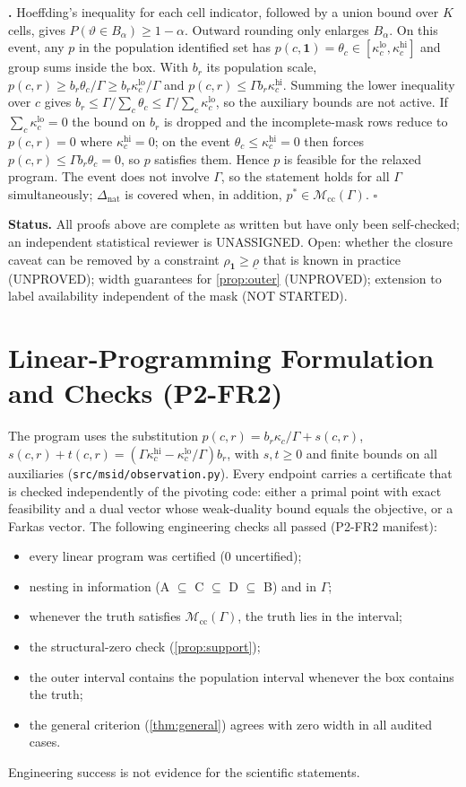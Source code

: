 \documentclass{article}
\theoremstyle{plain}
\theoremstyle{definition}
\theoremstyle{remark}
\newcommand{\one}{\mathbf{1}}
\newcommand{\Dnat}{\Delta_{\mathrm{nat}}}
\newcommand{\Mcc}{\mathcal{M}_{\mathrm{cc}}}
\begin{document}
\textbf{.} Hoeffding's inequality for each cell indicator,
followed by a union bound over $K$ cells, gives
$P(\vartheta\in B_\alpha)\ge1-\alpha$. Outward rounding only enlarges
$B_\alpha$. On this event, any $p$ in the population identified set has
$p(c,\one)=\theta_c\in[\kappa^{\mathrm{lo}}_c,\kappa^{\mathrm{hi}}_c]$ and group
sums inside the box. With $b_r$ its population scale,
$p(c,r)\ge b_r\theta_c/\Gamma\ge b_r\kappa^{\mathrm{lo}}_c/\Gamma$ and
$p(c,r)\le\Gamma b_r\kappa^{\mathrm{hi}}_c$. Summing the lower inequality over
$c$ gives $b_r\le\Gamma/\sum_c\theta_c\le\Gamma/\sum_c\kappa^{\mathrm{lo}}_c$,
so the auxiliary bounds are not active. If $\sum_c\kappa^{\mathrm{lo}}_c=0$ the
bound on $b_r$ is dropped and the incomplete-mask rows reduce to $p(c,r)=0$
where $\kappa^{\mathrm{hi}}_c=0$; on the event $\theta_c\le\kappa^{\mathrm{hi}}_c=0$
then forces $p(c,r)\le\Gamma b_r\theta_c=0$, so $p$ satisfies them. Hence $p$ is
feasible for the relaxed program. The event does not involve $\Gamma$, so the
statement holds for all $\Gamma$ simultaneously; $\Dnat$ is covered when, in
addition, $p^*\in\Mcc(\Gamma)$. $\square$

\textbf{Status.} All proofs above are complete as written but have only been
self-checked; an independent statistical reviewer is UNASSIGNED. Open: whether the closure caveat can be removed by a
constraint $\rho_{\one}\ge\underline\rho$ that is known in practice (UNPROVED);
width guarantees for \cref{prop:outer} (UNPROVED); extension to label
availability independent of the mask (NOT STARTED).

\section{Linear-Programming Formulation and Checks (P2-FR2)}
\label{app:fr2}

The program uses the substitution $p(c,r)=b_r\kappa_c/\Gamma+s(c,r)$,
$s(c,r)+t(c,r)=(\Gamma\kappa^{\mathrm{hi}}_c-\kappa^{\mathrm{lo}}_c/\Gamma)b_r$,
with $s,t\ge0$ and finite bounds on all auxiliaries (\texttt{src/msid/observation.py}).
Every endpoint carries a certificate that is checked independently of the
pivoting code: either a primal point with exact feasibility and a dual vector
whose weak-duality bound equals the objective, or a Farkas vector. The
following engineering checks all passed (P2-FR2 manifest):
\begin{itemize}
\item every linear program was certified (0 uncertified);
\item nesting in information (A $\subseteq$ C $\subseteq$ D $\subseteq$ B) and in $\Gamma$;
\item whenever the truth satisfies $\Mcc(\Gamma)$, the truth lies in the interval;
\item the structural-zero check (\cref{prop:support});
\item the outer interval contains the population interval whenever the box
contains the truth;
\item the general criterion (\cref{thm:general}) agrees with zero width in
all audited cases.
\end{itemize}
Engineering success is not evidence for the scientific statements.
\end{document}

